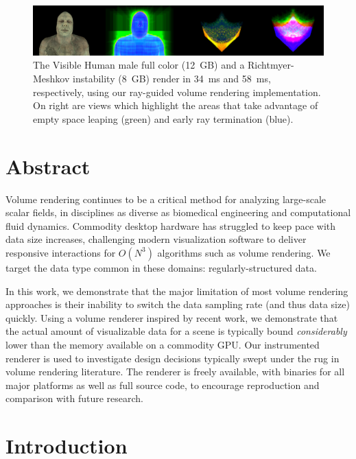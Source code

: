 \begin{figure}
  \includegraphics[draft=\isDraft, width=1.00\linewidth]{images/rg/teaser.png}
  \caption{The Visible Human male full color (\tjftilde{}12~GB) and
  a Richtmyer-Meshkov instability (\tjftilde{}8~GB) render in 34~ms
  and 58~ms, respectively, using our ray-guided volume rendering
  implementation.  On right are views which highlight the areas
  that take advantage of empty space leaping (green) and early ray
  termination (blue).}
  \label{fig:teaser}
\end{figure}

\section{Abstract}
Volume rendering continues to be a critical method for analyzing
large-scale scalar fields, in disciplines as diverse as biomedical
engineering and computational fluid dynamics.
Commodity desktop hardware has struggled to keep pace with data
size increases, challenging modern visualization software to
deliver responsive interactions for $O(N^3)$ algorithms such as
volume rendering.  We target the data type common in these domains:
regularly-structured data.

In this work, we demonstrate that the major limitation of most volume
rendering approaches is their inability to switch the data sampling
rate (and thus data size) quickly.  Using a volume renderer inspired by
recent work, we demonstrate that the actual amount of visualizable data
for a
scene is typically bound \emph{considerably} lower than the memory
available on a commodity GPU.  Our instrumented renderer is used to
investigate design decisions typically swept under the rug in volume
rendering literature.  The renderer is freely available, with binaries
for all major platforms as well as full source code, to encourage
reproduction and comparison with future research.

\section{Introduction}

